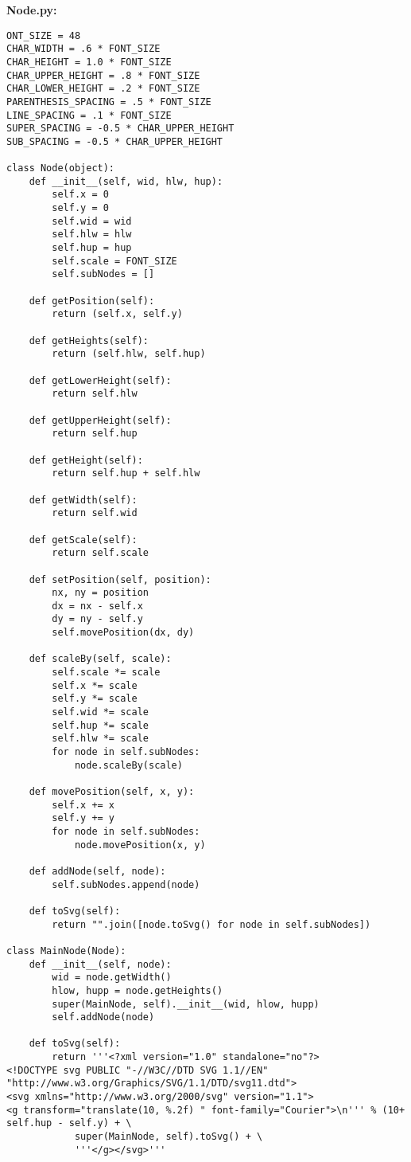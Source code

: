 \textbf{Node.py:}
\begin{verbatim}
ONT_SIZE = 48
CHAR_WIDTH = .6 * FONT_SIZE
CHAR_HEIGHT = 1.0 * FONT_SIZE
CHAR_UPPER_HEIGHT = .8 * FONT_SIZE
CHAR_LOWER_HEIGHT = .2 * FONT_SIZE
PARENTHESIS_SPACING = .5 * FONT_SIZE
LINE_SPACING = .1 * FONT_SIZE
SUPER_SPACING = -0.5 * CHAR_UPPER_HEIGHT
SUB_SPACING = -0.5 * CHAR_UPPER_HEIGHT

class Node(object):
    def __init__(self, wid, hlw, hup):
        self.x = 0
        self.y = 0
        self.wid = wid
        self.hlw = hlw
        self.hup = hup
        self.scale = FONT_SIZE
        self.subNodes = []

    def getPosition(self):
        return (self.x, self.y)

    def getHeights(self):
        return (self.hlw, self.hup)

    def getLowerHeight(self):
        return self.hlw

    def getUpperHeight(self):
        return self.hup

    def getHeight(self):
        return self.hup + self.hlw

    def getWidth(self):
        return self.wid

    def getScale(self):
        return self.scale

    def setPosition(self, position):
        nx, ny = position
        dx = nx - self.x
        dy = ny - self.y
        self.movePosition(dx, dy)

    def scaleBy(self, scale):
        self.scale *= scale
        self.x *= scale
        self.y *= scale
        self.wid *= scale
        self.hup *= scale
        self.hlw *= scale
        for node in self.subNodes:
            node.scaleBy(scale)

    def movePosition(self, x, y):
        self.x += x
        self.y += y
        for node in self.subNodes:
            node.movePosition(x, y)

    def addNode(self, node):
        self.subNodes.append(node)

    def toSvg(self):
        return "".join([node.toSvg() for node in self.subNodes])

class MainNode(Node):
    def __init__(self, node):
        wid = node.getWidth()
        hlow, hupp = node.getHeights()
        super(MainNode, self).__init__(wid, hlow, hupp)
        self.addNode(node)

    def toSvg(self):
        return '''<?xml version="1.0" standalone="no"?>
<!DOCTYPE svg PUBLIC "-//W3C//DTD SVG 1.1//EN"
"http://www.w3.org/Graphics/SVG/1.1/DTD/svg11.dtd">
<svg xmlns="http://www.w3.org/2000/svg" version="1.1">
<g transform="translate(10, %.2f) " font-family="Courier">\n''' % (10+ self.hup - self.y) + \
            super(MainNode, self).toSvg() + \
            '''</g></svg>'''


\end{verbatim}
